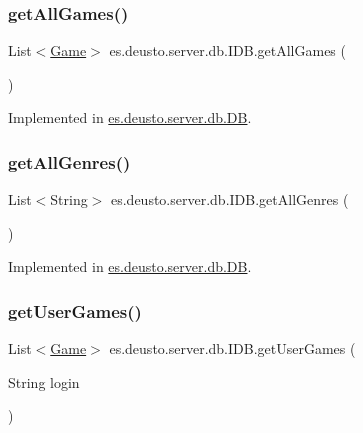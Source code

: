 \subsubsection{\texorpdfstring{get\+All\+Games()}{getAllGames()}}
{\footnotesize\ttfamily List$<$\hyperlink{classes_1_1deusto_1_1server_1_1db_1_1data_1_1_game}{Game}$>$ es.\+deusto.\+server.\+db.\+I\+D\+B.\+get\+All\+Games (\begin{DoxyParamCaption}{ }\end{DoxyParamCaption})}



Implemented in \hyperlink{classes_1_1deusto_1_1server_1_1db_1_1_d_b_ad878c1c58062596b5e1b582ed496bd11}{es.\+deusto.\+server.\+db.\+DB}.

\mbox{\label{interfacees_1_1deusto_1_1server_1_1db_1_1_i_d_b_ab0d82284b373b0ea3e0c441892e678b5}} 
\subsubsection{\texorpdfstring{get\+All\+Genres()}{getAllGenres()}}
{\footnotesize\ttfamily List$<$String$>$ es.\+deusto.\+server.\+db.\+I\+D\+B.\+get\+All\+Genres (\begin{DoxyParamCaption}{ }\end{DoxyParamCaption})}



Implemented in \hyperlink{classes_1_1deusto_1_1server_1_1db_1_1_d_b_a741c4c8b38c31010d5c86e1586ffa880}{es.\+deusto.\+server.\+db.\+DB}.

\mbox{\label{interfacees_1_1deusto_1_1server_1_1db_1_1_i_d_b_ac5ef9780a640140576f9373f8b57631c}} 
\subsubsection{\texorpdfstring{get\+User\+Games()}{getUserGames()}}
{\footnotesize\ttfamily List$<$\hyperlink{classes_1_1deusto_1_1server_1_1db_1_1data_1_1_game}{Game}$>$ es.\+deusto.\+server.\+db.\+I\+D\+B.\+get\+User\+Games (\begin{DoxyParamCaption}\item[{String}]{login }\end{DoxyParamCaption})}



